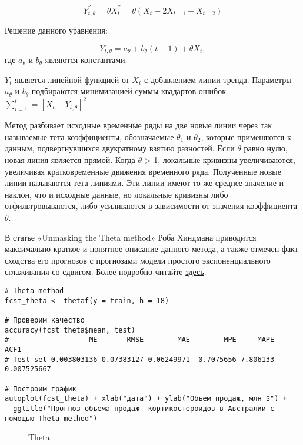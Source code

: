 \documentclass[a4paper,12pt]{article}
\theoremstyle{plain} %
\theoremstyle{definition} %
\theoremstyle{remark} %
\begin{document}
\begin{equation}
Y^{''}_{t,\theta}= \theta X^{''}_{t} = \theta(X_t - 2X_{t-1} + X_{t-2})
\end{equation}

Решение данного уравнения:

\begin{equation}
Y_{t,\theta}= a_{\theta} + b_{\theta}(t-1) + \theta X_{t},
\end{equation}
где $a_{\theta}$ и $b_{\theta}$ являются константами.

$Y_{t}$ является линейной функцией от $X_{t}$ с добавлением линии тренда.
Параметры $a_{\theta}$ и $b_{\theta}$ подбираются минимизацией суммы квадартов ошибок $\sum_{i=1}^{t} = [X_t - Y_{t,\theta}]^2$

Метод разбивает исходные временные ряды на две новые линии через так называемые тета-коэффициенты, обозначаемые  $\theta_1$ и $\theta_2$, которые применяются к данным, подвергнувшихся двукратному взятию разностей.
Если $\theta$ равно нулю, новая линия является прямой.
Когда $\theta$ > 1, локальные кривизны увеличиваются, увеличивая кратковременные движения временного ряда.
Полученные новые линии называются тета-линиями.
Эти линии имеют то же среднее значение и наклон, что и исходные данные, но локальные кривизны либо отфильтровываются, либо усиливаются в зависимости от значения коэффициента $\theta$.

В статье «Unmasking the Theta method» Роба Хиндмана приводится максимально краткое и понятное описание данного метода, а также отмечен факт сходства его прогнозов с прогнозами модели простого экспоненциального сглаживания со сдвигом.
Более подробно читайте \href{https://robjhyndman.com/papers/Theta.pdf}{здесь}.

\begin{verbatim}
# Theta method
fcst_theta <- thetaf(y = train, h = 18)

# Проверим качество
accuracy(fcst_theta$mean, test)
#                   ME       RMSE        MAE        MPE     MAPE        ACF1
# Test set 0.003803136 0.07383127 0.06249971 -0.7075656 7.806133 0.007525667

# Построим график
autoplot(fcst_theta) + xlab("дата") + ylab("Объем продаж, млн $") +
  ggtitle("Прогноз объема продаж  кортикостероидов в Австралии с помощью Theta-method")
\end{verbatim}

\begin{figure}[H]
  \noindent{}
  \caption{Theta}
  \label{figCurves}
\end{figure}
\end{document}
